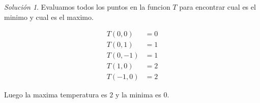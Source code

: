 \documentclass[a4paper,oneside,10.5pt]{article}
\theoremstyle{definition}
\theoremstyle{plain}
\theoremstyle{remark}
\theoremstyle{theorem}
\newtheorem{sol}{Solución}
\begin{document}
\begin{sol}
    Evaluamos todos los puntos en la funcion $T$ para encontrar cual es el minimo y cual es el maximo.

    \begin{align*}
        T(0, 0) &= 0\\
        T(0, 1) &= 1\\
        T(0, -1) &= 1\\
        T(1, 0) &= 2\\
        T(-1, 0) &= 2
    \end{align*}

    Luego la maxima temperatura es $2$ y la minima es $0$.
\end{sol}
\end{document}
